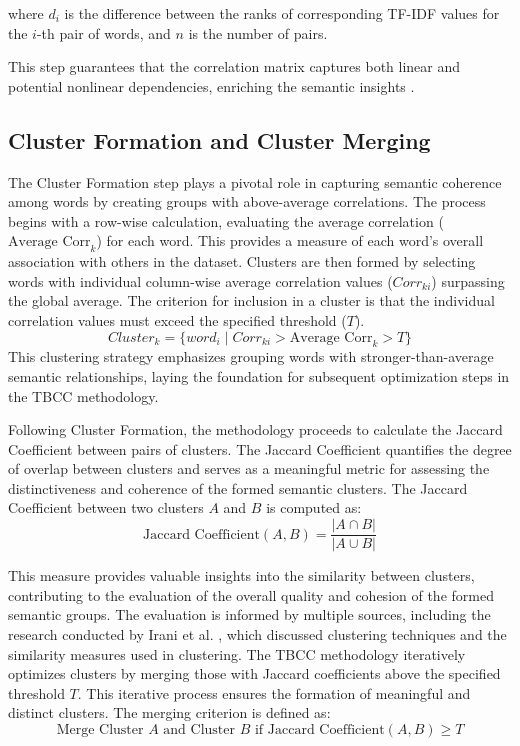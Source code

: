 \documentclass{article}
\begin{document}
where $d_i$ is the difference between the ranks of corresponding TF-IDF values for the $i$-th pair of words, and $n$ is the number of pairs.

This step guarantees that the correlation matrix captures both linear and potential nonlinear dependencies, enriching the semantic insights \cite{arsov2019measure}.
\subsection{Cluster Formation and Cluster Merging}

The Cluster Formation step plays a pivotal role in capturing semantic coherence among words by creating groups with above-average correlations. The process begins with a row-wise calculation, evaluating the average correlation (\( \text{Average Corr}_k \)) for each word. This provides a measure of each word's overall association with others in the dataset. Clusters are then formed by selecting words with individual column-wise average correlation values (\( Corr_{ki} \)) surpassing the global average. The criterion for inclusion in a cluster is that the individual correlation values must exceed the specified threshold (\( T \)).
\[ Cluster_k = \{word_i \mid Corr_{ki} > \text{Average Corr}_k > T\} \]
This clustering strategy emphasizes grouping words with stronger-than-average semantic relationships, laying the foundation for subsequent optimization steps in the TBCC methodology.


Following Cluster Formation, the methodology proceeds to calculate the Jaccard Coefficient between pairs of clusters. The Jaccard Coefficient quantifies the degree of overlap between clusters and serves as a meaningful metric for assessing the distinctiveness and coherence of the formed semantic clusters. The Jaccard Coefficient between two clusters \( A \) and \( B \) is computed as: \[ \text{Jaccard Coefficient}(A, B) = \frac{|A \cap B|}{|A \cup B|} \]

This measure provides valuable insights into the similarity between clusters, contributing to the evaluation of the overall quality and cohesion of the formed semantic groups. The evaluation is informed by multiple sources, including the research conducted by Irani et al. \cite{irani2016clustering}, which discussed clustering techniques and the similarity measures used in clustering.
The TBCC methodology iteratively optimizes clusters by merging those with Jaccard coefficients above the specified threshold \( T \). This iterative process ensures the formation of meaningful and distinct clusters. The merging criterion is defined as:
\[ \text{Merge Cluster } A \text{ and Cluster } B \text{ if } \text{Jaccard Coefficient}(A, B) \geq T \]
\end{document}
